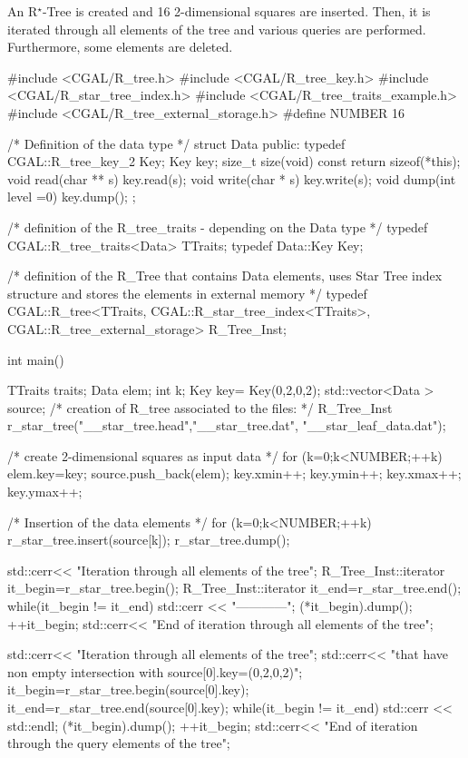 An R$^\star$-Tree is created and 16 2-dimensional squares are
inserted. Then, it is iterated through all elements of the tree
and various queries are performed. Furthermore, some elements are
deleted.



\ccExample
\begin{cprog}
#include <CGAL/R_tree.h>
#include <CGAL/R_tree_key.h>
#include <CGAL/R_star_tree_index.h>
#include <CGAL/R_tree_traits_example.h>
#include <CGAL/R_tree_external_storage.h>
#define NUMBER 16

/* Definition of the data type */
struct Data{
public:
  typedef CGAL::R_tree_key_2 Key;
  Key key;
  size_t size(void) const {
    return sizeof(*this);
  }
  void read(char ** s) {
    key.read(s);
  }
  void write(char * s) {
    key.write(s);
  }    
  void dump(int level =0){
    key.dump();
  }
};

/* definition of the R_tree_traits - depending on the Data type */
typedef CGAL::R_tree_traits<Data> TTraits; 
typedef Data::Key Key;

/* definition of the R_Tree that contains Data elements, uses 
   Star Tree index structure and stores the elements in 
   external memory */
typedef CGAL::R_tree<TTraits, CGAL::R_star_tree_index<TTraits>,
  CGAL::R_tree_external_storage> R_Tree_Inst;

int main() {
  TTraits traits;
  Data  elem; 
  int k; 
  Key key= Key(0,2,0,2);
  std::vector<Data > source;
  /* creation of R_tree associated to the files: */
  R_Tree_Inst r_star_tree("__star_tree.head","__star_tree.dat", 
                          "__star_leaf_data.dat");

  /* create 2-dimensional squares as input data */
  for (k=0;k<NUMBER;++k) {
    elem.key=key;
    source.push_back(elem);
    key.xmin++; key.ymin++; key.xmax++; key.ymax++;
  }

  /* Insertion of the data elements */
  for (k=0;k<NUMBER;++k) {
    r_star_tree.insert(source[k]);
  }
  r_star_tree.dump();

  std::cerr<< "Iteration through all elements of the tree\n";
  R_Tree_Inst::iterator it_begin=r_star_tree.begin();
  R_Tree_Inst::iterator it_end=r_star_tree.end();
  while(it_begin != it_end){
    std::cerr << "------------";
    (*it_begin).dump();
    ++it_begin;
  }
  std::cerr<< "End of iteration through all elements of the tree\n";

  std::cerr<< "Iteration through all elements of the tree\n";
  std::cerr<< "that have non empty intersection with source[0].key=(0,2,0,2)\n";
  it_begin=r_star_tree.begin(source[0].key);
  it_end=r_star_tree.end(source[0].key);
  while(it_begin != it_end){
    std::cerr << std::endl;
    (*it_begin).dump();
    ++it_begin;
  }
  std::cerr<< "End of iteration through the query elements of the tree\n";

}
\end{cprog}

